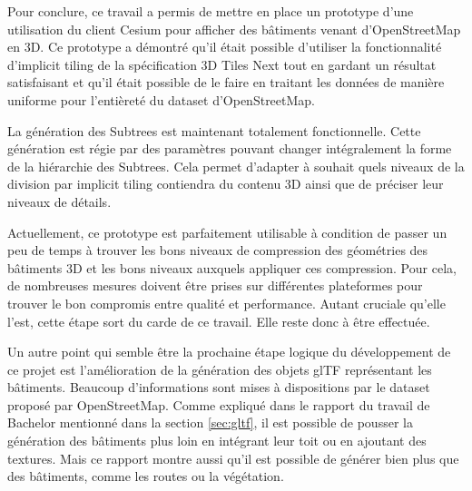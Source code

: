 


Pour conclure, ce travail a permis de mettre en place un prototype d'une utilisation du client Cesium pour afficher des bâtiments venant d'OpenStreetMap en 3D. Ce prototype a démontré qu'il était possible d'utiliser la fonctionnalité d'implicit tiling de la spécification 3D Tiles Next tout en gardant un résultat satisfaisant et qu'il était possible de le faire en traitant les données de manière uniforme pour l'entièreté du dataset d'OpenStreetMap.

La génération des Subtrees est maintenant totalement fonctionnelle. Cette génération est régie par des paramètres pouvant changer intégralement la forme de la hiérarchie des Subtrees. Cela permet d'adapter à souhait quels niveaux de la division par implicit tiling contiendra du contenu 3D ainsi que de préciser leur niveaux de détails.

Actuellement, ce prototype est parfaitement utilisable à condition de passer un peu de temps à trouver les bons niveaux de compression des géométries des bâtiments 3D et les bons niveaux auxquels appliquer ces compression. Pour cela, de nombreuses mesures doivent être prises sur différentes plateformes pour trouver le bon compromis entre qualité et performance. Autant cruciale qu'elle l'est, cette étape sort du carde de ce travail. Elle reste donc à être effectuée.

Un autre point qui semble être la prochaine étape logique du développement de ce projet est l'amélioration de la génération des objets glTF représentant les bâtiments. Beaucoup d'informations sont mises à dispositions par le dataset proposé par OpenStreetMap. Comme expliqué dans le rapport du travail de Bachelor mentionné dans la section \ref{sec:gltf}, il est possible de pousser la génération des bâtiments plus loin en intégrant leur toit ou en ajoutant des textures. Mais ce rapport montre aussi qu'il est possible de générer bien plus que des bâtiments, comme les routes ou la végétation.

\vfil
\hspace{8cm}\makeatletter\@author\makeatother\par
\hspace{8cm}\begin{minipage}{5cm}
    \printsignature
\end{minipage}
